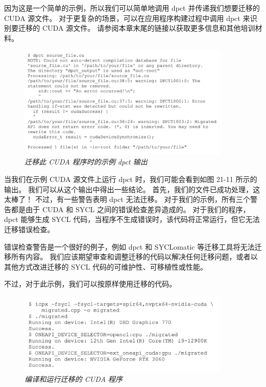 因为这是一个简单的示例，所以我们可以简单地调用 dpct 并传递我们想要迁移的 CUDA 源文件。 
对于更复杂的场景，可以在应用程序构建过程中调用 dpct 来识别要迁移的 CUDA 源文件。 
请参阅本章末尾的链接以获取更多信息和其他培训材料。

\begin{figure}[H]
	\centering
	\includegraphics[width=0.9\textwidth]{figs/F21.11.png}
	\caption{\textit{迁移此 CUDA 程序时的示例 dpct 输出 }}
\end{figure}

当我们在示例 CUDA 源文件上运行 dpct 时，我们可能会看到如图 21-11 所示的输出。 
我们可以从这个输出中得出一些结论。 首先，我们的文件已成功处理，这太棒了！ 不过，有一些警告表明 dpct 无法迁移。 
对于我们的示例，所有三个警告都是由于 CUDA 和 SYCL 之间的错误检查差异造成的。 
对于我们的程序，dpct 能够生成 SYCL 代码，当程序不生成错误时，该代码将正常运行，但它无法迁移错误检查。

错误检查警告是一个很好的例子，例如 dpct 和 SYCLomatic 等迁移工具将无法迁移所有内容。 
我们应该期望审查和调整迁移的代码以解决任何迁移问题，或者以其他方式改进迁移的 SYCL 代码的可维护性、可移植性或性能。

不过，对于此示例，我们可以按原样使用迁移的代码。

\begin{figure}[H]
	\centering
	\includegraphics[width=0.9\textwidth]{figs/F21.12.png}
	\caption{\textit{编译和运行迁移的 CUDA 程序 }}
\end{figure}

